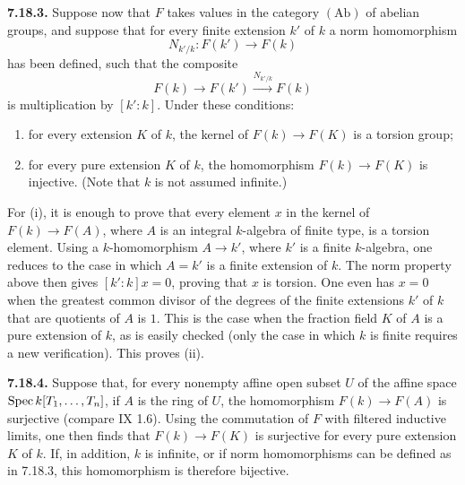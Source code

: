 \textbf{7.18.3.}
Suppose now that $F$ takes values in the category $(\mathrm{Ab})$ of
abelian groups, and suppose that for every finite extension $k'$ of $k$ a
norm homomorphism
\[
N_{k'/k}:F(k')\longrightarrow F(k)
\]
has been defined, such that the composite
\[
F(k)\longrightarrow F(k')\xrightarrow{N_{k'/k}}F(k)
\]
is multiplication by $[k':k]$. Under these conditions:
\begin{enumerate}[label=(\roman*)]
\item for every extension $K$ of $k$, the kernel of
  $F(k)\to F(K)$ is a torsion group;
\item for every pure extension $K$ of $k$, the homomorphism
  $F(k)\to F(K)$ is injective. (Note that $k$ is not assumed infinite.)
\end{enumerate}

For (i), it is enough to prove that every element $x$ in the kernel of
$F(k)\to F(A)$, where $A$ is an integral $k$-algebra of finite type, is a
torsion element. Using a $k$-homomorphism $A\to k'$, where $k'$ is a finite
$k$-algebra, one reduces to the case in which $A=k'$ is a finite extension
of $k$. The norm property above then gives $[k':k]x=0$, proving that $x$ is
torsion. One even has $x=0$ when the greatest common divisor of the degrees
of the finite extensions $k'$ of $k$ that are quotients of $A$ is $1$. This
is the case when the fraction field $K$ of $A$ is a pure extension of $k$,
as is easily checked (only the case in which $k$ is finite requires a new
verification). This proves (ii).

\textbf{7.18.4.}
Suppose that, for every nonempty affine open subset $U$ of the affine space
$\operatorname{Spec} k[T_1,\ldots,T_n]$, if $A$ is the ring of $U$, the homomorphism
$F(k)\to F(A)$ is surjective (compare IX 1.6). Using the commutation of $F$
with filtered inductive limits, one then finds that
$F(k)\to F(K)$ is surjective for every pure extension $K$ of $k$. If, in
addition, $k$ is infinite, or if norm homomorphisms can be defined as in
7.18.3, this homomorphism is therefore bijective.

